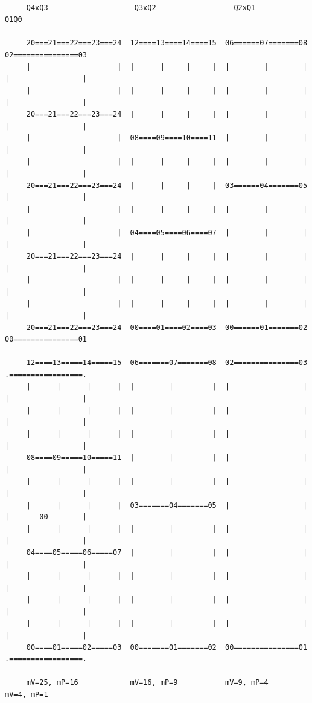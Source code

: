 {\tiny 
\begin{verbatim}

     Q4xQ3                    Q3xQ2                  Q2xQ1                 Q1Q0

     20===21===22===23===24  12====13====14====15  06======07=======08  02===============03
     |                    |  |      |     |     |  |        |        |  |                 |
     |                    |  |      |     |     |  |        |        |  |                 |
     20===21===22===23===24  |      |     |     |  |        |        |  |                 |
     |                    |  08====09====10====11  |        |        |  |                 |
     |                    |  |      |     |     |  |        |        |  |                 |
     20===21===22===23===24  |      |     |     |  03======04=======05  |                 |
     |                    |  |      |     |     |  |        |        |  |                 |
     |                    |  04====05====06====07  |        |        |  |                 |
     20===21===22===23===24  |      |     |     |  |        |        |  |                 |
     |                    |  |      |     |     |  |        |        |  |                 |
     |                    |  |      |     |     |  |        |        |  |                 |
     20===21===22===23===24  00====01====02====03  00======01=======02  00===============01 

     12====13=====14=====15  06=======07=======08  02===============03  .=================.
     |      |      |      |  |        |         |  |                 |  |                 |
     |      |      |      |  |        |         |  |                 |  |                 |
     |      |      |      |  |        |         |  |                 |  |                 |
     08====09=====10=====11  |        |         |  |                 |  |                 |
     |      |      |      |  |        |         |  |                 |  |                 |
     |      |      |      |  03=======04=======05  |                 |  |       00        |
     |      |      |      |  |        |         |  |                 |  |                 |
     04====05=====06=====07  |        |         |  |                 |  |                 |
     |      |      |      |  |        |         |  |                 |  |                 |
     |      |      |      |  |        |         |  |                 |  |                 |
     |      |      |      |  |        |         |  |                 |  |                 |
     00====01=====02=====03  00=======01=======02  00===============01  .=================.

     mV=25, mP=16            mV=16, mP=9           mV=9, mP=4           mV=4, mP=1      

\end{verbatim}
}

